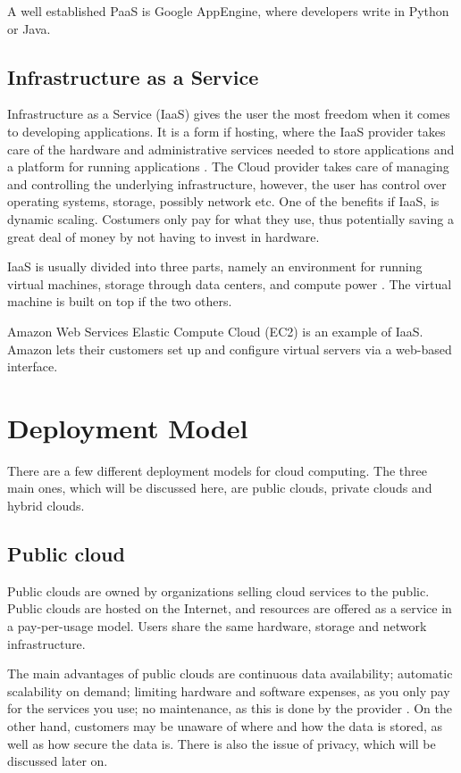A well established PaaS is Google AppEngine, where developers write in Python or Java.  

\subsection{Infrastructure as a Service}
Infrastructure as a Service (IaaS) gives the user the most freedom when it comes to developing applications. It is a form if hosting, where the IaaS provider takes care of the hardware and administrative services needed to store applications and a platform for running applications \cite{BhardwajJain}. The Cloud provider takes care of managing and controlling the underlying infrastructure, however, the user has control over operating systems, storage, possibly network etc.\cite{NIST} One of the benefits if IaaS, is dynamic scaling. Costumers only pay for what they use, thus potentially saving a great deal of money by not having to invest in hardware. 

IaaS is usually divided into three parts, namely an environment for running virtual machines, storage through data centers, and compute power \cite{BhardwajJain}. The virtual machine is built on top if the two others. 

Amazon Web Services Elastic Compute Cloud (EC2) is an example of IaaS. Amazon lets their customers set up and configure virtual servers via a web-based interface. 

\section{Deployment Model}
There are a few different deployment models for cloud computing. The three main ones, which will be discussed here, are public clouds, private clouds and hybrid clouds.

\subsection{Public cloud}
Public clouds are owned by organizations selling cloud services to the public. Public clouds are hosted on the Internet, and resources are offered as a service in a pay-per-usage model. Users share the same hardware, storage and network infrastructure. 

The main advantages of public clouds are continuous data availability; automatic scalability on demand; limiting hardware and software expenses, as you only pay for the services you use; no maintenance, as this is done by the provider \cite{GoyalSumit}. On the other hand, customers may be unaware of where and how the data is stored, as well as how secure the data is. There is also the issue of privacy, which will be discussed later on.

